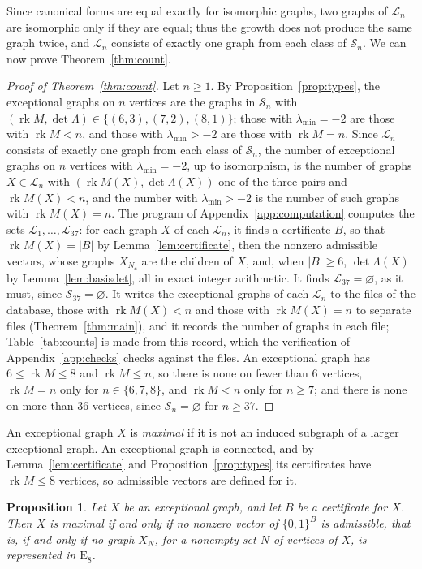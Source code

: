 \documentclass[11pt]{article}
\newcommand\cL{{\mathcal L}}
\newcommand\cS{{\mathcal S}}
\newcommand\opk[1]{\mathop{\mathrm{#1}}\nolimits}
\newcommand\rk{\opk{rk}}
\newtheorem{proposition}[theorem]{Proposition}
\theoremstyle{definition}
\newcommand{\typ}[1]{\mathrm{#1}}
\newcommand{\lmin}{\lambda_{\min}}
\newcommand\Zs{{\mathbf s}}
\begin{document}
Since canonical forms are equal exactly for isomorphic graphs, two graphs of $\cL_n$ are
isomorphic only if they are equal; thus the growth does not produce the same graph twice, and
$\cL_n$ consists of exactly one graph from each class of $\cS_n$. We can now prove
Theorem~\ref{thm:count}.

\begin{proof}[Proof of Theorem~\ref{thm:count}]
Let $n\ge1$. By Proposition~\ref{prop:types}, the exceptional graphs on $n$ vertices are the
graphs in $\cS_n$ with $(\rk M,\det\Lambda)\in\{(6,3),(7,2),(8,1)\}$; those with $\lmin=-2$ are
those with $\rk M<n$, and those with $\lmin>-2$ are those with $\rk M=n$. Since $\cL_n$ consists
of exactly one graph from each class of $\cS_n$, the number of exceptional graphs on $n$ vertices
with $\lmin=-2$, up to isomorphism, is the number of graphs $X\in\cL_n$ with
$(\rk M(X),\det\Lambda(X))$ one of the three pairs and $\rk M(X)<n$, and the number with
$\lmin>-2$ is the number of such graphs with $\rk M(X)=n$. The program of
Appendix~\ref{app:computation} computes the sets $\cL_1,\dots,\cL_{37}$: for each graph $X$ of
each $\cL_n$, it finds a certificate $B$, so that $\rk M(X)=\lvert B\rvert$ by
Lemma~\ref{lem:certificate}, then the nonzero admissible vectors, whose graphs $X_{N_\Zs}$ are the
children of $X$, and, when $\lvert B\rvert\ge6$, $\det\Lambda(X)$ by Lemma~\ref{lem:basisdet},
all in exact integer arithmetic. It finds $\cL_{37}=\varnothing$, as it must, since
$\cS_{37}=\varnothing$. It writes the exceptional graphs of each $\cL_n$ to the files of the
database, those with $\rk M(X)<n$ and those with $\rk M(X)=n$ to separate files
(Theorem~\ref{thm:main}), and it records the number of graphs in each file; Table~\ref{tab:counts} is made from this
record, which the verification of Appendix~\ref{app:checks} checks against the files. An
exceptional graph has $6\le\rk M\le8$ and $\rk M\le n$, so there is none on fewer than $6$
vertices, $\rk M=n$ only for $n\in\{6,7,8\}$, and $\rk M<n$ only for $n\ge7$; and there is none
on more than $36$ vertices, since $\cS_n=\varnothing$ for $n\ge37$.
\end{proof}

An exceptional graph $X$ is \textsl{maximal} if it is not an induced subgraph of a larger
exceptional graph. An exceptional graph is connected, and by Lemma~\ref{lem:certificate} and
Proposition~\ref{prop:types} its certificates have $\rk M\le8$ vertices, so admissible vectors are
defined for it.

\begin{proposition}\label{prop:maximal}
Let $X$ be an exceptional graph, and let $B$ be a certificate for $X$. Then $X$ is maximal if and
only if no nonzero vector of $\{0,1\}^B$ is admissible, that is, if and only if no graph $X_N$,
for a nonempty set $N$ of vertices of $X$, is represented in $\typ E_8$.
\end{proposition}
\end{document}
